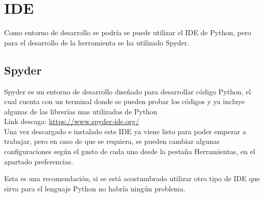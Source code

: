 \section{IDE}

Como entorno de desarrollo se podría se puede utilizar el IDE de Python, pero para el desarrollo de la herramienta se ha utilizado Spyder.

\subsection{Spyder}
Spyder es un entorno de desarrollo diseñado para desarrollar código Python, el cual cuenta con un terminal donde se pueden probar los códigos y ya incluye algunas de las librerías mas utilizadas de Python\\

Link descaga: \url{https://www.spyder-ide.org/} \\

Una vez descargado e instalado este IDE ya viene listo para poder empezar a trabajar, pero en caso de que se requiera, se pueden cambiar algunas configuraciones según el gusto de cada uno desde la pestaña Herramientas, en el apartado preferencias.\\


Esta es una recomendación, si se está acostumbrado utilizar otro tipo de IDE que sirva para el lenguaje Python no habría ningún problema.\\


